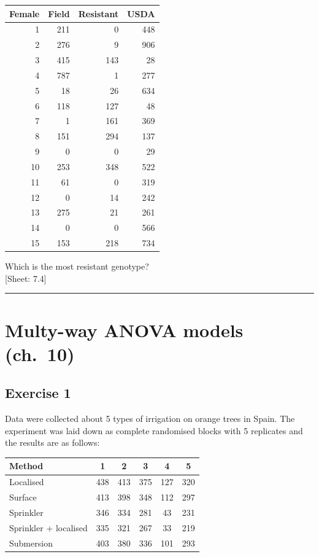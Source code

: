 \documentclass[a4paper,12pt,oneside]{book}
\begin{document}
\begin{longtable}[]{@{}rrrr@{}}
\toprule
Female & Field & Resistant & USDA \\
\midrule
\endhead
1 & 211 & 0 & 448 \\
2 & 276 & 9 & 906 \\
3 & 415 & 143 & 28 \\
4 & 787 & 1 & 277 \\
5 & 18 & 26 & 634 \\
6 & 118 & 127 & 48 \\
7 & 1 & 161 & 369 \\
8 & 151 & 294 & 137 \\
9 & 0 & 0 & 29 \\
10 & 253 & 348 & 522 \\
11 & 61 & 0 & 319 \\
12 & 0 & 14 & 242 \\
13 & 275 & 21 & 261 \\
14 & 0 & 0 & 566 \\
15 & 153 & 218 & 734 \\
\bottomrule
\end{longtable}

Which is the most resistant genotype?\\
{[}Sheet: 7.4{]}

\begin{center}\rule{0.5\linewidth}{0.5pt}\end{center}

\hypertarget{multy-way-anova-models-ch.-10}{%
\section{Multy-way ANOVA models (ch.~10)}\label{multy-way-anova-models-ch.-10}}

\hypertarget{exercise-1-5}{%
\subsection{Exercise 1}\label{exercise-1-5}}

Data were collected about 5 types of irrigation on orange trees in Spain. The experiment was laid down as complete randomised blocks with 5 replicates and the results are as follows:

\begin{longtable}[]{@{}lccccc@{}}
\toprule
Method & 1 & 2 & 3 & 4 & 5 \\
\midrule
\endhead
Localised & 438 & 413 & 375 & 127 & 320 \\
Surface & 413 & 398 & 348 & 112 & 297 \\
Sprinkler & 346 & 334 & 281 & 43 & 231 \\
Sprinkler + localised & 335 & 321 & 267 & 33 & 219 \\
Submersion & 403 & 380 & 336 & 101 & 293 \\
\bottomrule
\end{longtable}
\end{document}
